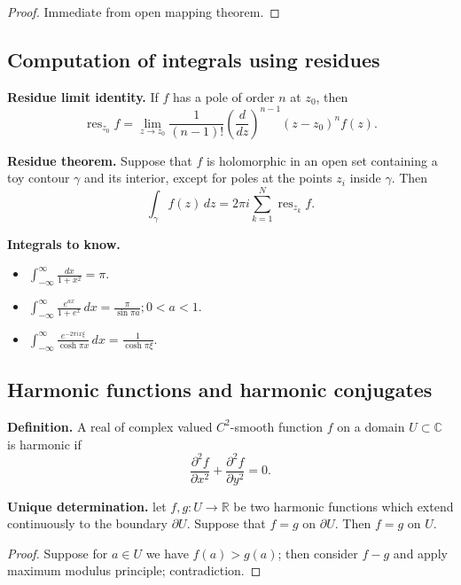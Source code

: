 \documentclass[12pt]{article}
\newcommand{\RR}{\mathbb{R}}
\newcommand{\CC}{\mathbb{C}}
\DeclareMathOperator{\res}{res}
\def\CC{\mathbb{C}}
\begin{document}
        \begin{proof}
          Immediate from open mapping theorem.
        \end{proof}

        \subsection{Computation of integrals using residues}

        {\bf Residue limit identity.} If $f$  has a pole of order $n$ at $z_0$, then
        \[
          \res_{z_0} f = \lim_{z \to z_0} \frac{1}{(n-1)!} \left( \frac{d}{dz} \right)^{n-1} (z - z_0)^n f(z).
        \]

        {\bf Residue theorem.} Suppose that $f$ is holomorphic in an open set containing a toy contour $\gamma$ and its interior, except for poles at the points $z_i$ inside $\gamma$.  Then
        \[
          \int_{\gamma} f(z) \, dz =2 \pi i \sum_{k=1}^{N} \res_{z_k} f.
          \]

          {\bf Integrals to know.}

          \begin{itemize}
            \item $\int_{- \infty}^{\infty} \frac{dx}{1+x^2} = \pi$.
            \item $\int_{- \infty}^{\infty} \frac{e^{ax}}{1 + e^x}\, dx = \frac{\pi}{ \sin \pi a}; 0 < a < 1$.
            \item $\int_{- \infty}^{\infty} \frac{e^{- 2 \pi i x \xi}}{\cosh \pi x} \, dx = \frac{1}{\cosh \pi \xi}$.
          \end{itemize}
        

        \subsection{Harmonic functions and harmonic conjugates}

        {\bf Definition.} A real of complex valued $C^2$-smooth function $f$ on a domain $U \subset \CC$ is harmonic if
          \[
            \frac{\partial^2 f}{\partial x^2} + \frac{\partial^2 f}{\partial y^2} = 0.
          \]

          {\bf Unique determination.} let $f, g : U \to \RR$ be two harmonic functions which extend continuously to the boundary $\partial U$.  Suppose that $f = g$ on $\partial U$.  Then $f = g$ on $U$.

          \begin{proof}
            Suppose for $a \in U$ we have $f(a) > g(a)$; then consider $f - g$ and apply maximum modulus principle; contradiction.
          \end{proof}
\end{document}
